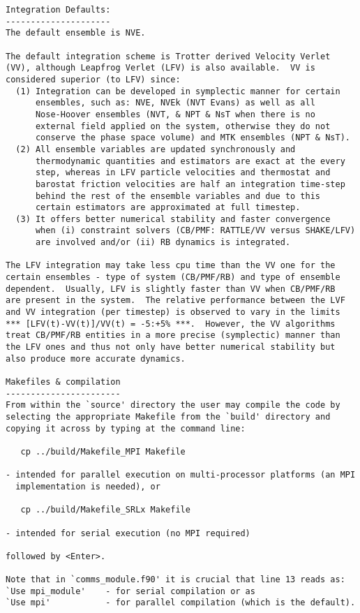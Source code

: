 \begin{verbatim}
Integration Defaults:
---------------------
The default ensemble is NVE.

The default integration scheme is Trotter derived Velocity Verlet
(VV), although Leapfrog Verlet (LFV) is also available.  VV is
considered superior (to LFV) since:
  (1) Integration can be developed in symplectic manner for certain
      ensembles, such as: NVE, NVEk (NVT Evans) as well as all
      Nose-Hoover ensembles (NVT, & NPT & NsT when there is no
      external field applied on the system, otherwise they do not
      conserve the phase space volume) and MTK ensembles (NPT & NsT).
  (2) All ensemble variables are updated synchronously and
      thermodynamic quantities and estimators are exact at the every
      step, whereas in LFV particle velocities and thermostat and
      barostat friction velocities are half an integration time-step
      behind the rest of the ensemble variables and due to this
      certain estimators are approximated at full timestep.
  (3) It offers better numerical stability and faster convergence
      when (i) constraint solvers (CB/PMF: RATTLE/VV versus SHAKE/LFV)
      are involved and/or (ii) RB dynamics is integrated.

The LFV integration may take less cpu time than the VV one for the
certain ensembles - type of system (CB/PMF/RB) and type of ensemble
dependent.  Usually, LFV is slightly faster than VV when CB/PMF/RB
are present in the system.  The relative performance between the LVF
and VV integration (per timestep) is observed to vary in the limits
*** [LFV(t)-VV(t)]/VV(t) = -5:+5% ***.  However, the VV algorithms
treat CB/PMF/RB entities in a more precise (symplectic) manner than
the LFV ones and thus not only have better numerical stability but
also produce more accurate dynamics.

Makefiles & compilation
-----------------------
From within the `source' directory the user may compile the code by
selecting the appropriate Makefile from the `build' directory and
copying it across by typing at the command line:

   cp ../build/Makefile_MPI Makefile

- intended for parallel execution on multi-processor platforms (an MPI
  implementation is needed), or

   cp ../build/Makefile_SRLx Makefile

- intended for serial execution (no MPI required)

followed by <Enter>.

Note that in `comms_module.f90' it is crucial that line 13 reads as:
`Use mpi_module'    - for serial compilation or as
`Use mpi'           - for parallel compilation (which is the default).


\end{verbatim}
